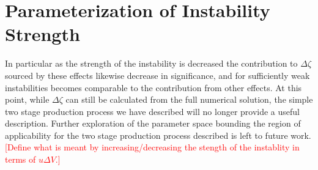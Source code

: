 
\section{Parameterization of Instability Strength} \label{sec:params}



In particular as the strength of the instability is decreased the contribution to $\Delta\zeta$ sourced by these effects likewise decrease in significance, and for sufficiently weak instabilities becomes comparable to the contribution from other effects. At this point, while $\Delta\zeta$ can still be calculated from the full numerical solution, the simple two stage production process we have described will no longer provide a useful description. Further exploration of the parameter space bounding the region of applicability for the two stage production process described is left to future work.
\textcolor{red}{[Define what is meant by increasing/decreasing the stength of the instablity in terms of $u\Delta V$.]}


